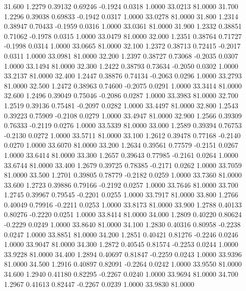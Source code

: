   31.600   1.2279   0.39132   0.69246  -0.1924   0.0318   1.0000  33.0213  81.0000
  31.700   1.2296   0.39038   0.69833  -0.1942   0.0317   1.0000  33.0278  81.0000
  31.800   1.2314   0.38947   0.70433  -0.1959   0.0316   1.0000  33.0361  81.0000
  31.900   1.2332   0.38851   0.71062  -0.1978   0.0315   1.0000  33.0479  81.0000
  32.000   1.2351   0.38764   0.71727  -0.1998   0.0314   1.0000  33.0665  81.0000
  32.100   1.2372   0.38713   0.72415  -0.2017   0.0311   1.0000  33.0981  81.0000
  32.200   1.2397   0.38727   0.73068  -0.2035   0.0307   1.0000  33.1494  81.0000
  32.300   1.2422   0.38793   0.73634  -0.2050   0.0302   1.0000  33.2137  81.0000
  32.400   1.2447   0.38876   0.74134  -0.2063   0.0296   1.0000  33.2793  81.0000
  32.500   1.2472   0.38963   0.74600  -0.2075   0.0291   1.0000  33.3414  81.0000
  32.600   1.2496   0.39049   0.75046  -0.2086   0.0287   1.0000  33.3983  81.0000
  32.700   1.2519   0.39136   0.75481  -0.2097   0.0282   1.0000  33.4497  81.0000
  32.800   1.2543   0.39223   0.75909  -0.2108   0.0279   1.0000  33.4947  81.0000
  32.900   1.2566   0.39309   0.76333  -0.2119   0.0276   1.0000  33.5339  81.0000
  33.000   1.2589   0.39394   0.76753  -0.2130   0.0272   1.0000  33.5711  81.0000
  33.100   1.2612   0.39478   0.77168  -0.2140   0.0270   1.0000  33.6070  81.0000
  33.200   1.2634   0.39561   0.77579  -0.2151   0.0267   1.0000  33.6414  81.0000
  33.300   1.2657   0.39643   0.77985  -0.2161   0.0264   1.0000  33.6744  81.0000
  33.400   1.2679   0.39725   0.78385  -0.2171   0.0262   1.0000  33.7059  81.0000
  33.500   1.2701   0.39805   0.78779  -0.2182   0.0259   1.0000  33.7360  81.0000
  33.600   1.2723   0.39886   0.79166  -0.2192   0.0257   1.0000  33.7646  81.0000
  33.700   1.2745   0.39967   0.79545  -0.2201   0.0255   1.0000  33.7917  81.0000
  33.800   1.2766   0.40049   0.79916  -0.2211   0.0253   1.0000  33.8173  81.0000
  33.900   1.2788   0.40133   0.80276  -0.2220   0.0251   1.0000  33.8414  81.0000
  34.000   1.2809   0.40220   0.80624  -0.2229   0.0249   1.0000  33.8640  81.0000
  34.100   1.2830   0.40316   0.80958  -0.2238   0.0247   1.0000  33.8851  81.0000
  34.200   1.2851   0.40421   0.81276  -0.2246   0.0246   1.0000  33.9047  81.0000
  34.300   1.2872   0.40545   0.81574  -0.2253   0.0244   1.0000  33.9228  81.0000
  34.400   1.2894   0.40697   0.81847  -0.2259   0.0243   1.0000  33.9396  81.0000
  34.500   1.2916   0.40897   0.82091  -0.2264   0.0242   1.0000  33.9550  81.0000
  34.600   1.2940   0.41180   0.82295  -0.2267   0.0240   1.0000  33.9694  81.0000
  34.700   1.2967   0.41613   0.82447  -0.2267   0.0239   1.0000  33.9830  81.0000
